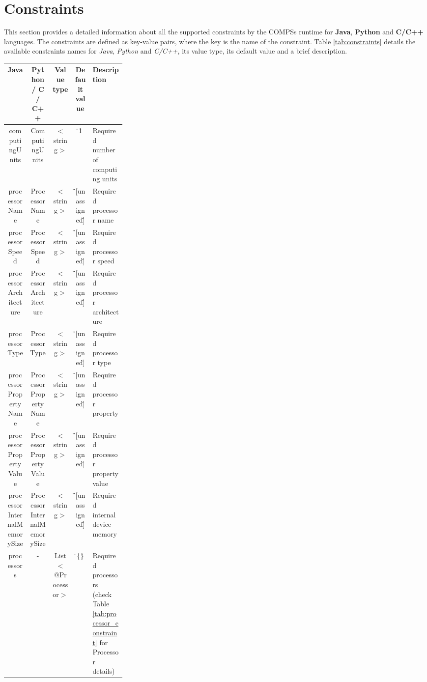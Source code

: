 \section{Constraints}
\label{sec:Constraints}

This section provides a detailed information about all the supported constraints by the COMPSs runtime for 
\textbf{Java}, \textbf{Python} and \textbf{C/C++} languages. The constraints are defined as key-value pairs,
where the key is the name of the constraint. Table \ref{tab:constraints} details the available constraints names 
for \textit{Java}, \textit{Python} and \textit{C/C++}, its value type, its default value and a brief description.

\newpage

\begin{landscape}
\bgroup
  \def\arraystretch{1.3}%
  \begin{table}[!ht]
  \centering
  \begin{tabular}{ | c | c | c | c | p{0.28\linewidth} | }
  \hline
  \textbf{Java} 		& \textbf{Python / C / C++}	& \textbf{Value type}	& \textbf{Default value}& \textbf{Description} \\ \hline
  computingUnits 		& ComputingUnits 		& $<$string$>$ 		& \"{}1\" 		& Required number of computing units \\ \hline
  processorName 		& ProcessorName 		& $<$string$>$ 		& \"{}[unassigned]\" 	& Required processor name \\ \hline
  processorSpeed 		& ProcessorSpeed 		& $<$string$>$ 		& \"{}[unassigned]\" 	& Required processor speed \\ \hline
  processorArchitecture 	& ProcessorArchitecture 	& $<$string$>$ 		& \"{}[unassigned]\" 	& Required processor architecture \\ \hline
  processorType			& ProcessorType		 	& $<$string$>$ 		& \"{}[unassigned]\" 	& Required processor type \\ \hline
  processorPropertyName		& ProcessorPropertyName 	& $<$string$>$ 		& \"{}[unassigned]\" 	& Required processor property \\ \hline
  processorPropertyValue	& ProcessorPropertyValue 	& $<$string$>$ 		& \"{}[unassigned]\" 	& Required processor property value \\ \hline
  processorInternalMemorySize 	& ProcessorInternalMemorySize 	& $<$string$>$ 		& \"{}[unassigned]\" 	& Required internal device memory \\ \hline
  processors 			& - 				& List$<$@Processor$>$  & \"{}\{\}\" 		& Required processors (check Table \ref{tab:processor_constraint} for Processor details) \\ \hline

\end{tabular}
\end{table}
\end{landscape}
